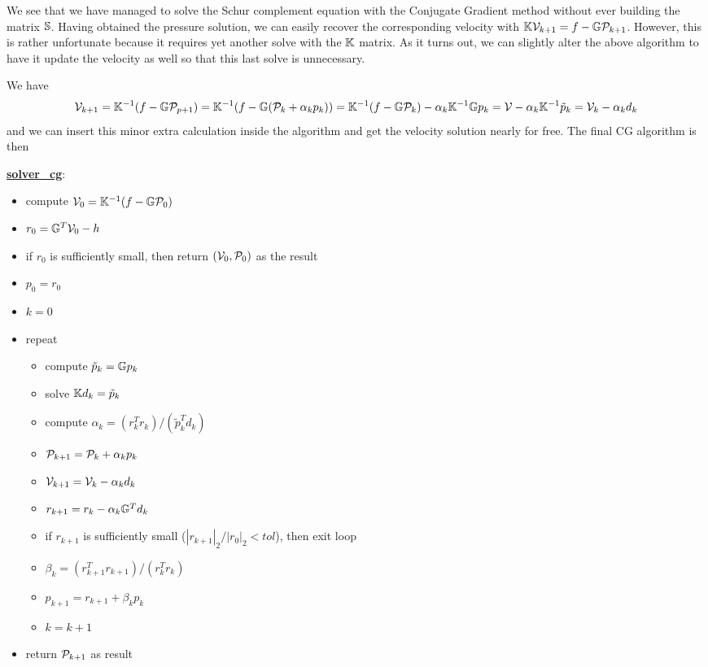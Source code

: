 We see that we have managed to solve the Schur complement equation with the Conjugate Gradient method
without ever building the matrix ${\mathbb{S}}$. Having obtained the pressure solution, we can easily recover the corresponding velocity with ${\mathbb{K}} {\cal V}_{k+1} =f- {\mathbb{G}} {\cal P}_{k+1}$. However, this is rather unfortunate because it requires yet another solve with the ${\mathbb{K}}$ matrix. As it turns out, we can slightly alter the above algorithm to have it update the velocity as well so that this last solve is unnecessary.

We have 
\[
{\cal V}_{k+1} 
= {\mathbb{K}}^{-1} (f - {\mathbb{G}} {\cal P}_{p+1} )
= {\mathbb{K}}^{-1} (f - {\mathbb{G}} ({\cal P}_k+\alpha_k p_k) )
= {\mathbb{K}}^{-1} (f - {\mathbb{G}} {\cal P}_k) - \alpha_k {\mathbb{K}}^{-1} {\mathbb{G}} p_k 
= {\cal V} - \alpha_k {\mathbb{K}}^{-1} \tilde{p}_k 
= {\cal V}_k - \alpha_k d_k 
\] 
and we can insert this minor extra calculation inside the algorithm and get the velocity solution 
nearly for free. The final CG algorithm is then 

\begin{mdframed}[backgroundcolor=blue!5]
\underline{\bf solver\_cg}:
\begin{itemize}
\item compute ${\cal V}_0={\mathbb{K}}^{-1}(f-{\mathbb{G}}{\cal P}_0)$
\item $r_0 = {\mathbb{G}}^T {\cal V}_0 - h$ 
\item if $r_0$ is sufficiently small, then return $({\cal V}_0,{\cal P}_0)$ as the result
\item $p_0=r_0$
\item $k=0$
\item repeat
\begin{itemize}
\item compute $\tilde{p}_k = {\mathbb{G}} p_k$
\item solve ${\mathbb{K}} d_k = \tilde{p}_k$
\item compute $\alpha_k=(r_k^T r_k)/(\tilde{p}_k^T d_k)$
\item ${\cal P}_{k+1} = {\cal P}_k+\alpha_k p_k$
\item $ {\cal V}_{k+1} = {\cal V}_k - \alpha_k d_k$
\item $r_{k+1} = r_k - \alpha_k {\mathbb{G}}^T d_k $
\item if $r_{k+1}$ is sufficiently small ($|r_{k+1}|_2/|r_0|_2 <tol$), then exit loop
\item $\beta_k=(r_{k+1}^T r_{k+1})/(r_k^T r_k)$
\item $p_{k+1} =r_{k+1}+ \beta_k p_k$
\item $k=k+1$
\end{itemize}
\item return ${\cal P}_{k+1}$ as result
\end{itemize}
\end{mdframed}

